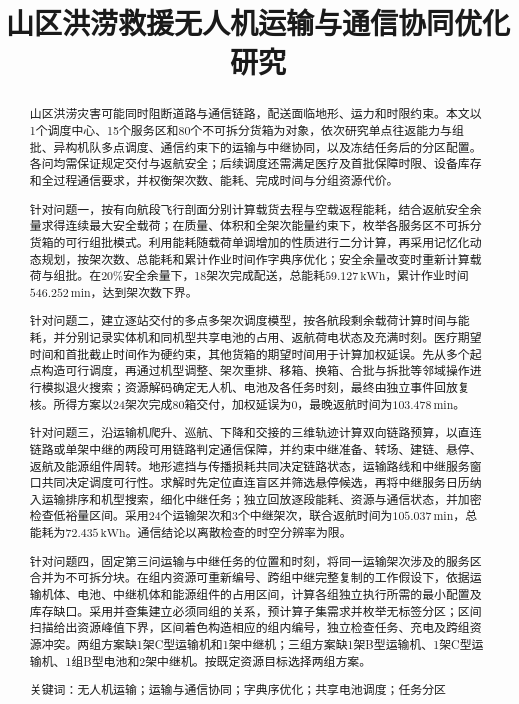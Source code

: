 \documentclass[bwprint]{gmcmthesis}
\title{山区洪涝救援无人机运输与通信协同优化研究}
\begin{document}
\maketitle

\begin{abstract}
山区洪涝灾害可能同时阻断道路与通信链路，配送面临地形、运力和时限约束。本文以1个调度中心、15个服务区和80个不可拆分货箱为对象，依次研究单点往返能力与组批、异构机队多点调度、通信约束下的运输与中继协同，以及冻结任务后的分区配置。各问均需保证规定交付与返航安全；后续调度还需满足医疗及首批保障时限、设备库存和全过程通信要求，并权衡架次数、能耗、完成时间与分组资源代价。

针对问题一，按有向航段飞行剖面分别计算载货去程与空载返程能耗，结合返航安全余量求得连续最大安全载荷；在质量、体积和全架次能量约束下，枚举各服务区不可拆分货箱的可行组批模式。利用能耗随载荷单调增加的性质进行二分计算，再采用记忆化动态规划，按架次数、总能耗和累计作业时间作字典序优化；安全余量改变时重新计算载荷与组批。在$20\%$安全余量下，18架次完成配送，总能耗$59.127\,\mathrm{kWh}$，累计作业时间$546.252\,\mathrm{min}$，达到架次数下界。

针对问题二，建立逐站交付的多点多架次调度模型，按各航段剩余载荷计算时间与能耗，并分别记录实体机和同机型共享电池的占用、返航荷电状态及充满时刻。医疗期望时间和首批截止时间作为硬约束，其他货箱的期望时间用于计算加权延误。先从多个起点构造可行调度，再通过机型调整、架次重排、移箱、换箱、合批与拆批等邻域操作进行模拟退火搜索；资源解码确定无人机、电池及各任务时刻，最终由独立事件回放复核。所得方案以24架次完成80箱交付，加权延误为0，最晚返航时间为$103.478\,\mathrm{min}$。

针对问题三，沿运输机爬升、巡航、下降和交接的三维轨迹计算双向链路预算，以直连链路或单架中继的两段可用链路判定通信保障，并约束中继准备、转场、建链、悬停、返航及能源组件周转。地形遮挡与传播损耗共同决定链路状态，运输路线和中继服务窗口共同决定调度可行性。求解时先定位直连盲区并筛选悬停候选，再将中继服务日历纳入运输排序和机型搜索，细化中继任务；独立回放逐段能耗、资源与通信状态，并加密检查低裕量区间。采用24个运输架次和3个中继架次，联合返航时间为$105.037\,\mathrm{min}$，总能耗为$72.435\,\mathrm{kWh}$。通信结论以离散检查的时空分辨率为限。

针对问题四，固定第三问运输与中继任务的位置和时刻，将同一运输架次涉及的服务区合并为不可拆分块。在组内资源可重新编号、跨组中继完整复制的工作假设下，依据运输机体、电池、中继机体和能源组件的占用区间，计算各组独立执行所需的最小配置及库存缺口。采用并查集建立必须同组的关系，预计算子集需求并枚举无标签分区；区间扫描给出资源峰值下界，区间着色构造相应的组内编号，独立检查任务、充电及跨组资源冲突。两组方案缺1架C型运输机和1架中继机；三组方案缺1架B型运输机、1架C型运输机、1组B型电池和2架中继机。按既定资源目标选择两组方案。

\par\vspace{\baselineskip}
\noindent
{\lishu{} 关键词}：无人机运输；运输与通信协同；字典序优化；共享电池调度；任务分区
\end{abstract}
\end{document}
